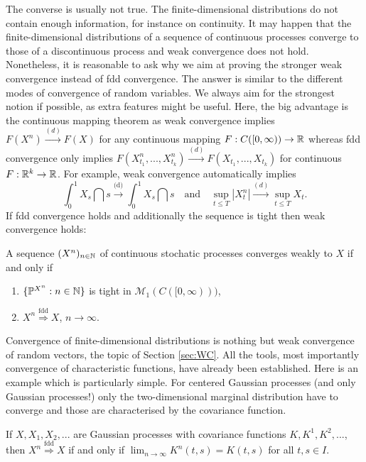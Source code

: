 	The converse is usually not true. The finite-dimensional distributions do not contain enough information, for instance on continuity. It may happen that the finite-dimensional distributions of a sequence of continuous processes converge to those of a discontinuous process and weak convergence does not hold. Nonetheless, it is reasonable to ask why we aim at proving the stronger weak convergence instead of fdd convergence. The answer is similar to the different modes of convergence of random variables. We always aim for the strongest notion if possible, as extra features might be useful. Here, the big advantage is the continuous mapping theorem as weak convergence implies $F(X^n)\overset{(d)}{\rightarrow} F(X)$ for any continuous mapping $F:C([0,\infty))\to \mathbb{R}$ whereas fdd convergence only implies $F(X^n_{t_1},..., X^n_{t_k})\overset{(d)}{\rightarrow} F(X_{t_1},..., X_{t_k})$ for continuous $F:\mathbb{R}^k\to \mathbb{R}$. For example, weak convergence automatically implies $$\int_0^1 X_s\dint s\overset{\text{(d)}}{\longrightarrow}\int_0^1 X_s\dint s\quad \text{and}\quad \sup_{t\leq T}|X_t^n|\overset{(d)}{\longrightarrow} \sup_{t\leq T}X_t.$$ If fdd convergence holds and additionally the sequence is tight then weak convergence holds:
	\begin{lAussageWerkzeug}
\begin{theorem}
	A sequence $(X^n)_{n\in\mathbb{N}}$ of continuous stochatic processes converges weakly to $X$ if and only if  
	\begin{enumerate}[label=(\roman*)]
		\item $\{\mathbb P^{X^n}:n\in\mathbb{N}\}$ is tight in $\mathcal M_1(C([0,\infty)))$,
		\item $X^n \overset{\text{fdd}}{\Longrightarrow}X$, $n\to\infty$.
	\end{enumerate}
\end{theorem}
\end{lAussageWerkzeug}
Convergence of finite-dimensional distributions is nothing but weak convergence of random vectors, the topic of Section \ref{sec:WC}. All the tools, most importantly convergence of characteristic functions, have already been established. Here is an example which is particularly simple. For centered Gaussian processes (and only Gaussian processes!) only the two-dimensional marginal distribution have to converge and those are characterised by the covariance function. 
\begin{luebung}
	If $X, X_1, X_2,...$ are Gaussian processes with covariance functions $K, K^1, K^2,...$, then $X^n \overset{\text{fdd}}{\Longrightarrow}X$ if and only if $\lim_{n\to\infty}K^n(t,s)=K(t,s)$ for all $t,s\in I$.
\end{luebung}
